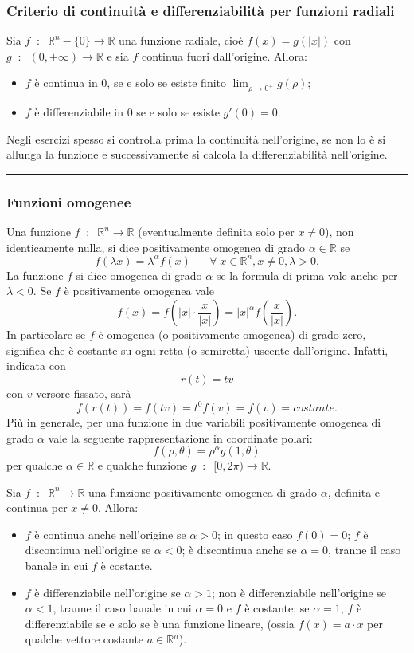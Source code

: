 \subsubsection*{Criterio di continuità e differenziabilità per funzioni radiali}
Sia $f \;\;:\;\; \mathbb{R}^n-\{0\} \rightarrow  \mathbb{R}$ una funzione radiale, cioè $f(x) = g(|x|)$ con $g \;\;:\;\;(0, +\infty) \rightarrow \mathbb{R}$ e sia $f$ continua fuori dall'origine. Allora:
\begin{itemize}
    \item $f$ è continua in $0$, se e solo se esiste finito $\lim_{\rho\rightarrow 0^+}g(\rho)$;
    \item $f$ è differenziabile in $0$ se e solo se esiste $g'(0)=0$.
\end{itemize}
Negli esercizi spesso si controlla prima la continuità nell'origine, se non lo è si allunga la funzione e successivamente si calcola la differenziabilità nell'origine.\newline
\rule{\textwidth}{0.4pt}
\subsubsection*{Funzioni omogenee}
Una funzione $f \;\;:\;\; \mathbb{R}^n \rightarrow \mathbb{R}$ (eventualmente definita solo per $x\neq 0$), non identicamente nulla, si dice positivamente omogenea di grado $\alpha \in \mathbb{R}$ se
\[
    f(\lambda x) = \lambda^\alpha f(x) \;\;\;\;\; \;\forall\;x \in \mathbb{R}^n, x\neq 0, \lambda>0.
\]
La funzione $f$ si dice omogenea di grado $\alpha$ se la formula di prima vale anche per $\lambda<0$.\newline
Se $f$ è positivamente omogenea vale
\[
    f(x) = f( |x| \cdot \frac{x}{|x|}) = |x|^\alpha f(\frac{x}{|x|}).
\]
In particolare se $f$ è omogenea (o positivamente omogenea) di grado zero, significa che è costante su ogni retta (o semiretta) uscente dall'origine. Infatti, indicata con
\[
    r(t)=tv
\]
con $v$ versore fissato, sarà
\[
    f(r(t))=f(tv)=t^0f(v)=f(v)=costante.
\]
Più in generale, per una funzione in due variabili positivamente omogenea di grado $\alpha$ vale la seguente rappresentazione in coordinate polari:
\[
    f(\rho, \theta)=\rho^\alpha g(1,\theta)
\]
per qualche $\alpha \in \mathbb{R}$ e qualche funzione $g \;\;:\;\; [0, 2\pi) \rightarrow \mathbb{R}$.\newline

Sia $f \;\;:\;\; \mathbb{R}^n \rightarrow \mathbb{R}$ una funzione positivamente omogenea di grado $\alpha$, definita e continua per $x\neq 0$. Allora:
\begin{itemize}
    \item $f$ è continua anche nell'origine se $\alpha>0$; in questo caso $f(0) = 0$; $f$ è discontinua nell'origine se $\alpha<0$; è discontinua anche se $\alpha=0$, tranne il caso banale in cui $f$ è costante.
    \item $f$ è differenziabile nell'origine se $\alpha>1$; non è differenziabile nell'origine se $\alpha <1$, tranne il caso banale in cui $\alpha=0$ e $f$ è costante; se $\alpha=1$, $f$ è differenziabile se e solo se è una funzione lineare, (ossia $f(x) = a \cdot x$ per qualche vettore costante $a \in \mathbb{R}^n$).
\end{itemize}

